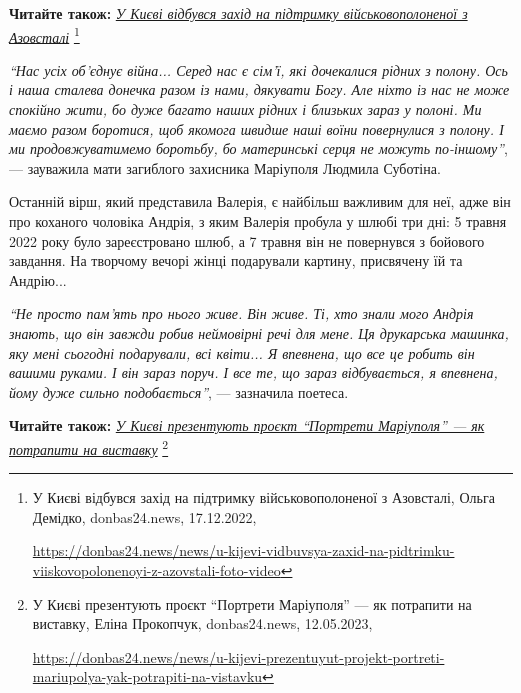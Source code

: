\textbf{Читайте також:} \href{https://donbas24.news/news/u-kijevi-vidbuvsya-zaxid-na-pidtrimku-viiskovopolonenoyi-z-azovstali-foto-video}{\emph{У Києві відбувся захід на підтримку військовополоненої з Азовсталі}}%
\footnote{У Києві відбувся захід на підтримку військовополоненої з Азовсталі, Ольга Демідко, donbas24.news, 17.12.2022, \par%
\url{https://donbas24.news/news/u-kijevi-vidbuvsya-zaxid-na-pidtrimku-viiskovopolonenoyi-z-azovstali-foto-video}%
}


\begin{leftbar}
\emph{\enquote{Нас усіх об'єднує війна... Серед нас є сім'ї, які дочекалися рідних з полону.
Ось і наша сталева донечка разом із нами, дякувати Богу. Але ніхто із нас не
може спокійно жити, бо дуже багато наших рідних і близьких зараз у полоні. Ми
маємо разом боротися, щоб якомога швидше наші воїни повернулися з полону. І ми
продовжуватимемо боротьбу, бо материнські серця не можуть по-іншому}}, —
зауважила мати загиблого захисника Маріуполя Людмила Суботіна.
\end{leftbar}

Останній вірш, який представила Валерія, є найбільш важливим для неї, адже він
про коханого чоловіка Андрія, з яким Валерія пробула у шлюбі три дні: 5 травня
2022 року було зареєстровано шлюб, а 7 травня він не повернувся з бойового
завдання. На творчому вечорі жінці подарували картину, присвячену їй та Андрію... 

\begin{leftbar}
\emph{\enquote{Не просто пам'ять про нього живе. Він живе. Ті, хто знали мого Андрія
знають, що він завжди робив неймовірні речі для мене. Ця друкарська
машинка, яку мені сьогодні подарували, всі квіти... Я впевнена, що все це
робить він вашими руками. І він зараз поруч. І все те, що зараз
відбувається, я впевнена, йому дуже сильно подобається}}, — зазначила
поетеса.
\end{leftbar}

\textbf{Читайте також:} \href{https://donbas24.news/news/u-kijevi-prezentuyut-projekt-portreti-mariupolya-yak-potrapiti-na-vistavku}{\emph{У Києві презентують проєкт \enquote{Портрети Маріуполя} — як потрапити на виставку}}%
\footnote{У Києві презентують проєкт \enquote{Портрети Маріуполя} — як потрапити на виставку, Еліна Прокопчук, donbas24.news, 12.05.2023, \par%
\url{https://donbas24.news/news/u-kijevi-prezentuyut-projekt-portreti-mariupolya-yak-potrapiti-na-vistavku}%
}

